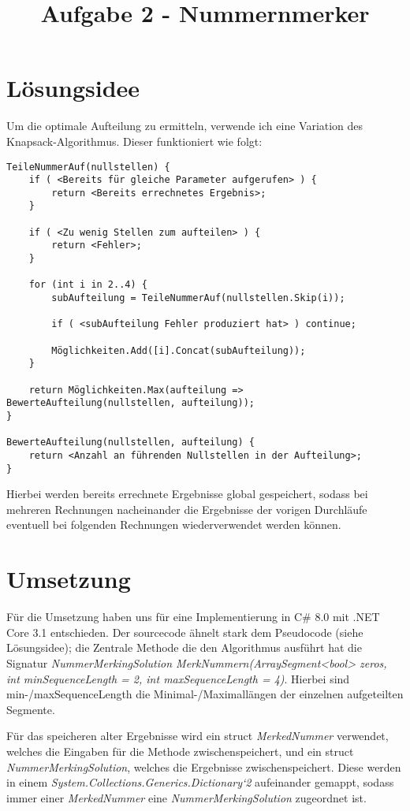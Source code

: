 \documentclass[12pt]{article}
\begin{document}
\title{Aufgabe 2 - Nummernmerker}

\section{Lösungsidee}

Um die optimale Aufteilung zu ermitteln, verwende ich eine Variation des Knapsack-Algorithmus. Dieser funktioniert wie folgt:

\begin{lstlisting}
TeileNummerAuf(nullstellen) {
    if ( <Bereits für gleiche Parameter aufgerufen> ) {
        return <Bereits errechnetes Ergebnis>;
    }
    
    if ( <Zu wenig Stellen zum aufteilen> ) {
    	return <Fehler>;
    }

    for (int i in 2..4) {
        subAufteilung = TeileNummerAuf(nullstellen.Skip(i));

		if ( <subAufteilung Fehler produziert hat> ) continue;
		
        Möglichkeiten.Add([i].Concat(subAufteilung));
    }

    return Möglichkeiten.Max(aufteilung => BewerteAufteilung(nullstellen, aufteilung));
}

BewerteAufteilung(nullstellen, aufteilung) {
    return <Anzahl an führenden Nullstellen in der Aufteilung>;
}
\end{lstlisting}

Hierbei werden bereits errechnete Ergebnisse global gespeichert, sodass bei mehreren Rechnungen nacheinander die Ergebnisse der vorigen Durchläufe eventuell bei folgenden Rechnungen wiederverwendet werden können.

\section{Umsetzung}

Für die Umsetzung haben uns für eine Implementierung in C\# 8.0 mit .NET Core 3.1 entschieden.
Der sourcecode ähnelt stark dem Pseudocode (siehe Lösungsidee); die Zentrale Methode die den Algorithmus ausführt hat die Signatur \textit{NummerMerkingSolution MerkNummern(ArraySegment<bool> zeros, int minSequenceLength = 2, int maxSequenceLength = 4)}. Hierbei sind min-/maxSequenceLength die Minimal-/Maximallängen der einzelnen aufgeteilten Segmente.

Für das speicheren alter Ergebnisse wird ein struct \textit{MerkedNummer} verwendet, welches die Eingaben für die Methode zwischenspeichert, und ein struct \textit{NummerMerkingSolution}, welches die Ergebnisse zwischenspeichert. Diese werden in einem \textit{System.Collections.Generics.Dictionary`2} aufeinander gemappt, sodass immer einer \textit{MerkedNummer} eine \textit{NummerMerkingSolution} zugeordnet ist.
\end{document}
